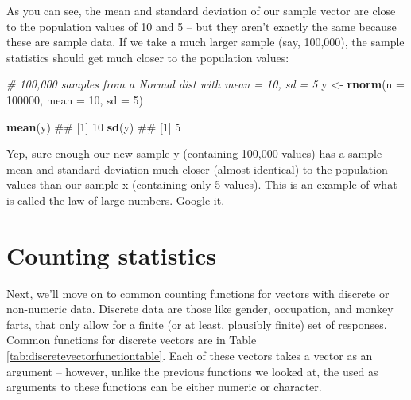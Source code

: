 \documentclass[]{book}
\newenvironment{Shaded}{\begin{snugshade}}{\end{snugshade}}
\newcommand{\KeywordTok}[1]{\textcolor[rgb]{0.13,0.29,0.53}{\textbf{{#1}}}}
\newcommand{\DataTypeTok}[1]{\textcolor[rgb]{0.13,0.29,0.53}{{#1}}}
\newcommand{\DecValTok}[1]{\textcolor[rgb]{0.00,0.00,0.81}{{#1}}}
\newcommand{\StringTok}[1]{\textcolor[rgb]{0.31,0.60,0.02}{{#1}}}
\newcommand{\CommentTok}[1]{\textcolor[rgb]{0.56,0.35,0.01}{\textit{{#1}}}}
\newcommand{\NormalTok}[1]{{#1}}
\theoremstyle{definition}
\theoremstyle{definition}
\theoremstyle{remark}
\begin{document}
As you can see, the mean and standard deviation of our sample vector are
close to the population values of 10 and 5 -- but they aren't exactly
the same because these are sample data. If we take a much larger sample
(say, 100,000), the sample statistics should get much closer to the
population values:

\begin{Shaded}
\begin{Highlighting}[]
\CommentTok{# 100,000 samples from a Normal dist with mean = 10, sd = 5}
\NormalTok{y <-}\StringTok{ }\KeywordTok{rnorm}\NormalTok{(}\DataTypeTok{n =} \DecValTok{100000}\NormalTok{, }\DataTypeTok{mean =} \DecValTok{10}\NormalTok{, }\DataTypeTok{sd =} \DecValTok{5}\NormalTok{)}

\KeywordTok{mean}\NormalTok{(y)}
\NormalTok{## [1] 10}
\KeywordTok{sd}\NormalTok{(y)}
\NormalTok{## [1] 5}
\end{Highlighting}
\end{Shaded}

Yep, sure enough our new sample y (containing 100,000 values) has a
sample mean and standard deviation much closer (almost identical) to the
population values than our sample x (containing only 5 values). This is
an example of what is called the law of large numbers. Google it.

\section{Counting statistics}\label{counting-statistics}

Next, we'll move on to common counting functions for vectors with
discrete or non-numeric data. Discrete data are those like gender,
occupation, and monkey farts, that only allow for a finite (or at least,
plausibly finite) set of responses. Common functions for discrete
vectors are in Table \ref{tab:discretevectorfunctiontable}. Each of
these vectors takes a vector as an argument -- however, unlike the
previous functions we looked at, the used as arguments to these
functions can be either numeric or character.
\end{document}
